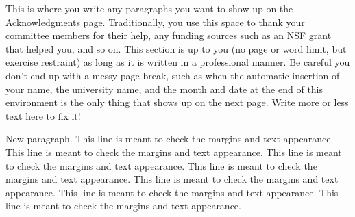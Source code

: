 \documentclass[12pt]{book}                  %
\begin{document}
\begin{thesisacknowledgments}
This is where you write any paragraphs you want to show up on the Acknowledgments page.
Traditionally, you use this space to thank your committee members for their help, any
funding sources such as an NSF grant that helped you, and so on.  This section is up to
you (no page or word limit, but exercise restraint) as long as it is written in a
professional manner. Be careful you don't end up with a messy page break, such as when
the automatic insertion of your name, the university name, and the month and date at the
end of this environment is the only thing that shows up on the next page.  Write more or
less text here to fix it!

New paragraph. This line is meant to check the margins and text appearance. This line is
meant to check the margins and text appearance. This line is meant to check the margins
and text appearance. This line is meant to check the margins and text appearance. This
line is meant to check the margins and text appearance. This line is meant to check the
margins and text appearance. This line is meant to check the margins and text appearance.

\end{thesisacknowledgments}






%



\appendix
\end{document}
